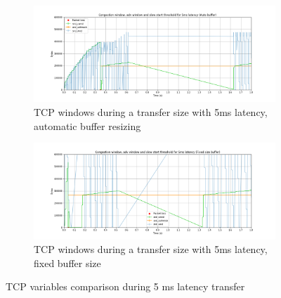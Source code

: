 \documentclass[a4paper,10pt]{article}
\begin{document}
\begin{figure}[]
\begin{subfigure}{\textwidth}
    \centering
    \includegraphics[width=\textwidth]{images/5_cwnd_wnd_comparison_auto.png}
    \caption{TCP windows during a transfer size with 5ms latency, automatic buffer resizing}
    \label{fig:5ms_wnd_auto}
\end{subfigure}%
\qquad
\begin{subfigure}{\textwidth}
   \centering
   \includegraphics[width=\textwidth]{images/5_cwnd_wnd_comparison_fixed.png}
   \caption{TCP windows during a transfer size with 5ms latency, fixed buffer size}
   \label{fig:5ms_wnd_fixed}
\end{subfigure}
\caption[short]{TCP variables comparison during 5 ms latency transfer}
\label{fig:tcp_variables_5ms}
\end{figure}
\end{document}
